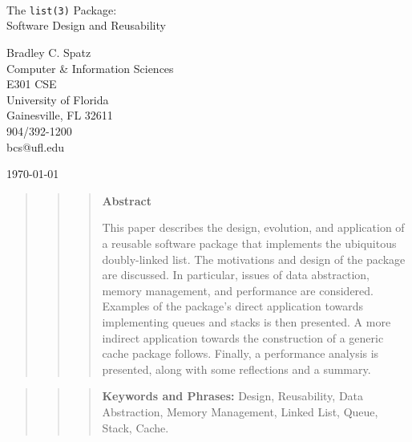 \documentclass[fullpage,11pt]{article}
\begin{document}
\pagestyle{empty}
\begin{center}
\LARGE{
\ \\
\ \\
\ \\
The {\tt list(3)} Package:\\
Software Design and Reusability
}

\bigskip
\bigskip
\large{
Bradley C. Spatz\\
Computer \& Information Sciences\\
E301 CSE\\
University of Florida\\
Gainesville, FL 32611\\
904/392-1200\\
bcs@ufl.edu

\bigskip
\today
}
\end{center}

\vspace{1in}
\begin{quote} \begin{quote} \begin{quote}
\begin{centering}
{\bf Abstract}\\
\end{centering}
\medskip
This paper describes the design, evolution, and application of a reusable
software package that implements the ubiquitous doubly-linked list.  The
motivations and design of the package are discussed.  In particular, issues
of data abstraction, memory management, and performance are considered.
\medskip\\
Examples of the package's direct application towards implementing queues and
stacks is then presented.  A more indirect application towards the
construction of a generic cache package follows.  Finally, a performance
analysis is presented, along with some reflections and a summary.
\end{quote} \end{quote} \end{quote}

\vspace{.5in}
\begin{quote} \begin{quote} \begin{quote}
{\bf Keywords and Phrases:} Design, Reusability, Data Abstraction, Memory
Management, Linked List, Queue, Stack, Cache.
\end{quote} \end{quote} \end{quote}
\end{document}
